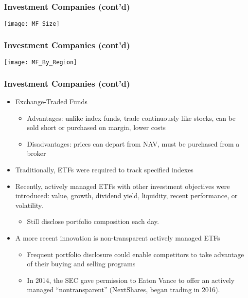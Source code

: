 \documentclass[10pt]{beamer}
\begin{document}
	
	
	\begin{frame}
		\frametitle{Investment Companies (cont'd)}
		
		\begin{center} 
			\texttt{[image: MF\_Size]}		
		\end{center}
		
	\end{frame}
	
	
	
	\begin{frame}
		\frametitle{Investment Companies (cont'd)}
		
		\begin{center} 
			\texttt{[image: MF\_By\_Region]}		
		\end{center}
		
	\end{frame}
	
	
	
	\begin{frame}
		\frametitle{Investment Companies (cont'd)}
		
		\begin{itemize} 
			\item Exchange-Traded Funds
			\begin{itemize}
				\item Advantages: unlike index funds, trade continuously like stocks, can be sold short or purchased on margin, lower costs
				\item Disadvantages: prices can depart from NAV, must be purchased from a broker
				
			\end{itemize}
			\item Traditionally, ETFs were required to track specified indexes
			\item Recently, actively managed ETFs with other investment objectives were introduced: value, growth, dividend yield, liquidity, recent performance, or volatility. %
			\begin{itemize}
				\item Still disclose portfolio composition each day. 
			\end{itemize}
			
			\item A more recent innovation is non-transparent actively managed ETFs 
			\begin{itemize}
				\item Frequent portfolio disclosure could enable competitors to take advantage of their buying and selling programs
				\item In 2014, the SEC gave permission to Eaton Vance to offer an actively managed ``nontransparent'' (NextShares, began trading in 2016).
			\end{itemize}
			
			
		\end{itemize}
		
	\end{frame}
	
\end{document}
